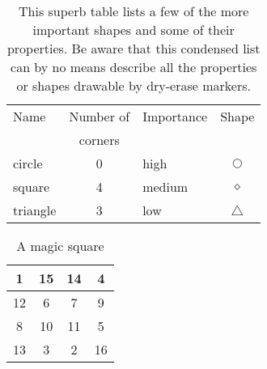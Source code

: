 	\begin{table}[ht]
	    \centering
	    \caption[Shapes]{This superb table lists a few
		of the more important shapes and some of
		their properties. Be aware that this condensed list
		can by no means describe all the properties or
		shapes drawable by dry-erase markers.}
	    \bigskip

	    \begin{tabular}{|l|c|l|c|}
		\hline \hline
		Name  & Number of & Importance & Shape \\
		      & corners   &            &       \\
		\hline
		circle & 0        & high       & $\bigcirc$ \\
		square & 4        & medium     & $\diamond$ \\
		triangle & 3      & low        & $\triangle$ \\
		\hline
	    \end{tabular}
	    \label{tab1}
	\end{table}

	\begin{table}[ht]
	    \centering
	    \caption{A magic square}
	    \bigskip

	    \begin{tabular}{|c|c|c|c|}
		\hline
		    1 & 15 & 14 & 4 \\ \hline
		    12 & 6 & 7 & 9 \\ \hline
		    8 & 10 & 11 & 5 \\ \hline
		    13 & 3 & 2 & 16 \\ \hline
	    \end{tabular}
	    \label{tab2}
	\end{table}
